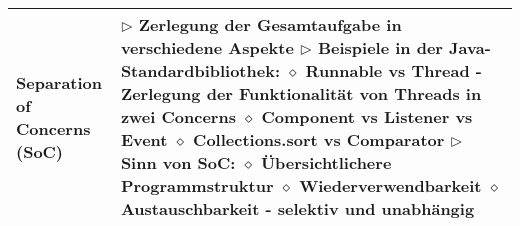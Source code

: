 \begin{longtable}{ | p{} p{} | }
	\makecell[l]{Separation of \\ Concerns (SoC)} & \makecell[l]{
	$\triangleright$ Zerlegung der Gesamtaufgabe in verschiedene Aspekte \\
	$\triangleright$ Beispiele in der Java-Standardbibliothek: \\
	\hspace{0.4cm} $\diamond$ Runnable vs Thread \\
	\hspace{0.6cm} - Zerlegung der Funktionalität von Threads in zwei Concerns \\
	\hspace{0.4cm} $\diamond$ Component vs Listener vs Event \\
	\hspace{0.4cm} $\diamond$ Collections.sort vs Comparator \\
	$\triangleright$ Sinn von SoC: \\
	\hspace{0.4cm} $\diamond$ Übersichtlichere Programmstruktur \\
	\hspace{0.4cm} $\diamond$ Wiederverwendbarkeit \\
	\hspace{0.4cm} $\diamond$ Austauschbarkeit - selektiv und unabhängig} \\ \hline	


\end{longtable}
